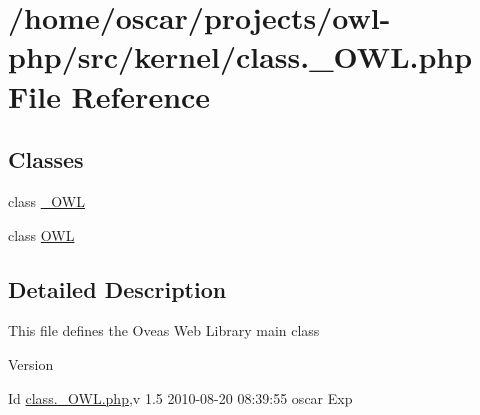 \section{/home/oscar/projects/owl-\/php/src/kernel/class.\_\-OWL.php File Reference}
\label{class_8__OWL_8php}
\subsection*{Classes}
\begin{DoxyCompactItemize}
\item 
class \hyperlink{class__OWL}{\_\-OWL}
\item 
class \hyperlink{classOWL}{OWL}
\end{DoxyCompactItemize}


\subsection{Detailed Description}
This file defines the Oveas Web Library main class \begin{DoxyVersion}{Version}

\end{DoxyVersion}
\begin{DoxyParagraph}{Id}
\hyperlink{class_8__OWL_8php}{class.\_\-OWL.php},v 1.5 2010-\/08-\/20 08:39:55 oscar Exp 
\end{DoxyParagraph}
